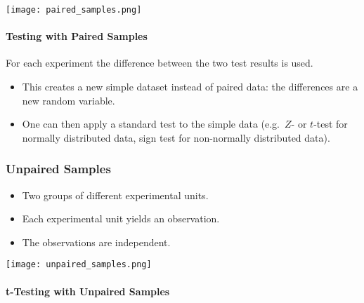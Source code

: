\begin{center}
    \texttt{[image: paired\_samples.png]}
\end{center}

\newpar{}
\paragraph{Testing with Paired Samples}

For each experiment the difference between the two test results is used.
\begin{itemize}
    \item This creates a new simple dataset instead of paired data: the differences are a new random variable.
    \item One can then apply a standard test to the simple data (e.g.\ $Z$- or $t$-test for normally distributed data, sign test for non-normally distributed data).
\end{itemize}

\subsubsection{Unpaired Samples}

\begin{itemize}
    \item Two groups of different experimental units.
    \item Each experimental unit yields an observation.
    \item The observations are independent.
\end{itemize}

\begin{center}
    \texttt{[image: unpaired\_samples.png]}
\end{center}

\paragraph{t-Testing with Unpaired Samples}

